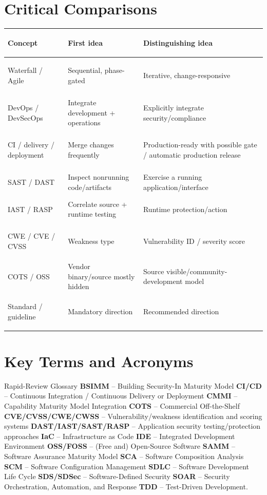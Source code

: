 \documentclass[10pt,letterpaper]{article}
\begin{document}
\section{\color{navy}Critical Comparisons}
\begin{center}\small
\begin{tabularx}{\textwidth}{>{\bfseries\color{navy}\raggedright\arraybackslash}p{}>{\raggedright\arraybackslash}X>{\raggedright\arraybackslash}X}
\toprule Concept & First idea & Distinguishing idea\\\midrule
Waterfall / Agile & Sequential, phase-gated & Iterative, change-responsive\\
DevOps / DevSecOps & Integrate development + operations & Explicitly integrate security/compliance\\
CI / delivery / deployment & Merge changes frequently & Production-ready with possible gate / automatic production release\\
SAST / DAST & Inspect nonrunning code/artifacts & Exercise a running application/interface\\
IAST / RASP & Correlate source + runtime testing & Runtime protection/action\\
CWE / CVE / CVSS & Weakness type & Vulnerability ID / severity score\\
COTS / OSS & Vendor binary/source mostly hidden & Source visible/community-development model\\
Standard / guideline & Mandatory direction & Recommended direction\\
\bottomrule
\end{tabularx}
\end{center}

\section{\color{navy}Key Terms and Acronyms}
\begin{summarybox}{Rapid-Review Glossary}
\textbf{BSIMM} -- Building Security-In Maturity Model \quad
\textbf{CI/CD} -- Continuous Integration / Continuous Delivery or Deployment \quad
\textbf{CMMI} -- Capability Maturity Model Integration \quad
\textbf{COTS} -- Commercial Off-the-Shelf \quad
\textbf{CVE/CVSS/CWE/CWSS} -- Vulnerability/weakness identification and scoring systems \quad
\textbf{DAST/IAST/SAST/RASP} -- Application security testing/protection approaches \quad
\textbf{IaC} -- Infrastructure as Code \quad
\textbf{IDE} -- Integrated Development Environment \quad
\textbf{OSS/FOSS} -- (Free and) Open-Source Software \quad
\textbf{SAMM} -- Software Assurance Maturity Model \quad
\textbf{SCA} -- Software Composition Analysis \quad
\textbf{SCM} -- Software Configuration Management \quad
\textbf{SDLC} -- Software Development Life Cycle \quad
\textbf{SDS/SDSec} -- Software-Defined Security \quad
\textbf{SOAR} -- Security Orchestration, Automation, and Response \quad
\textbf{TDD} -- Test-Driven Development.
\end{summarybox}
\end{document}
